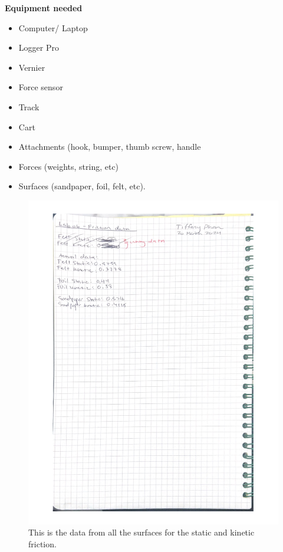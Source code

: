\documentclass[idxtotoc,hyperref,openany]{labbook} %
\begin{document}
\hfill \break
\textbf{Equipment needed}
\begin{itemize}
    \item Computer/ Laptop
    \item Logger Pro
    \item Vernier
    \item Force sensor
    \item Track
    \item Cart
    \item Attachments (hook, bumper, thumb screw, handle
    \item Forces (weights, string, etc)
    \item Surfaces (sandpaper, foil, felt, etc).
\end{itemize}


\newpage
{}
\begin{figure}[H] %
\begin{center}
\includegraphics[width=0.8\linewidth]{images/Lab.06/Lab06Data.pdf}
\end{center}
\caption{This is the data from all the surfaces for the static and kinetic friction.}
\label{fig:Lab06Data}
\end{figure}
\end{document}
